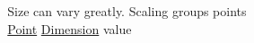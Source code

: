 ~\newline
~\newline
~\newline
~\newline
~\newline
~\newline
~\newline
~\newline
~\newline
~\newline
~\newline
~\newline
~\newline
~\newline
~\newline
~\newline
~\newline
 Size can vary greatly. Scaling groups points ~\newline
~\newline
~\newline
~\newline
~\newline
~\newline
~\newline
~\newline
~\newline
~\newline
~\newline
~\newline
~\newline
~\newline
~\newline
~\newline
~\newline
~\newline
~\newline
~\newline
 \mbox{\hyperlink{classPoint}{Point}} \mbox{\hyperlink{classDimension}{Dimension}} value ~\newline
~\newline
~\newline
~\newline
~\newline
~\newline
~\newline
~\newline
~\newline
~\newline
~\newline
~\newline
~\newline
